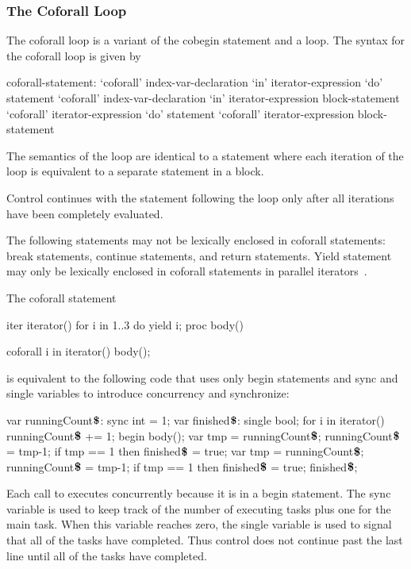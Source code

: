 \subsubsection{The Coforall Loop}
\label{Coforall}

The coforall loop is a variant of the cobegin statement and a loop.
The syntax for the coforall loop is given by
\begin{syntax}
coforall-statement:
  `coforall' index-var-declaration `in' iterator-expression `do' statement
  `coforall' index-var-declaration `in' iterator-expression block-statement
  `coforall' iterator-expression `do' statement
  `coforall' iterator-expression block-statement
\end{syntax}

The semantics of the  loop are identical to
a  statement where each iteration of the 
loop is equivalent to a separate statement in a  block.

Control continues with the statement following the 
loop only after all iterations have been completely evaluated.

The following statements may not be lexically enclosed in
coforall statements: break statements, continue statements, and
return statements.  Yield statement may only be lexically enclosed in
coforall statements in parallel iterators~.

\begin{example}
The coforall statement
\begin{chapelpre}
iter iterator() { for i in 1..3 do yield i; }
proc body() { }
\end{chapelpre}
\begin{chapel}
coforall i in iterator() {
  body();
}
\end{chapel}
is equivalent to the following code that uses only begin statements
and sync and single variables to introduce concurrency and
synchronize:
\begin{chapel}
var runningCount$\mbox{{\bf \$}}$: sync int = 1;
var finished$\mbox{{\bf \$}}$: single bool;
for i in iterator() {
  runningCount$\mbox{{\bf \$}}$ += 1;
  begin {
    body();
    var tmp = runningCount$\mbox{{\bf \$}}$;
    runningCount$\mbox{{\bf \$}}$ = tmp-1;
    if tmp == 1 then finished$\mbox{{\bf \$}}$ = true;
  }
}
var tmp = runningCount$\mbox{{\bf \$}}$;
runningCount$\mbox{{\bf \$}}$ = tmp-1;
if tmp == 1 then finished$\mbox{{\bf \$}}$ = true;
finished$\mbox{{\bf \$}}$;
\end{chapel}
\begin{chapeloutput}
\end{chapeloutput}
Each call to  executes concurrently because it is in a
begin statement.  The sync
variable  is used to keep track of
the number of executing tasks plus one for the main task.  When this
variable reaches zero, the single
variable  is used to signal that all
of the tasks have completed.  Thus control does not continue past the
last line until all of the tasks have completed.
\end{example}

